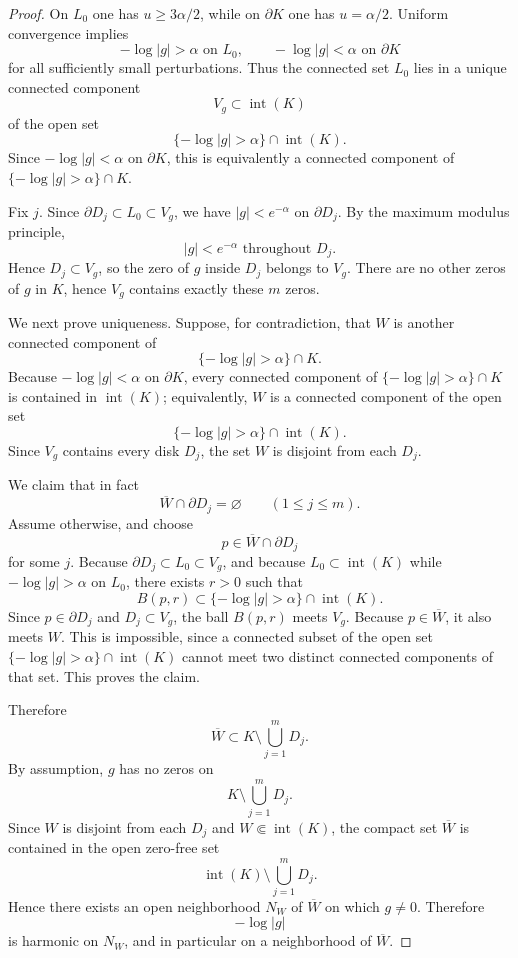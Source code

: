\documentclass[12pt]{amsart}
\theoremstyle{definition}
\theoremstyle{remark}
\begin{document}
\begin{proof} On $L_0$ one has $u\ge 3\alpha/2$, while on $\partial K$ one has $u=\alpha/2$. Uniform convergence implies
\[
 -\log|g|>\alpha \text{ on }L_0,\qquad -\log|g|<\alpha \text{ on }\partial K
\]
for all sufficiently small perturbations. Thus the connected set $L_0$ lies in a unique connected component
\[
 V_g\subset \operatorname{int}(K)
\]
of the open set
\[
\{-\log|g|>\alpha\}\cap \operatorname{int}(K).
\]
Since $-\log|g|<\alpha$ on $\partial K$, this is equivalently a connected component of
$\{-\log|g|>\alpha\}\cap K$.

\indent Fix $j$. Since $\partial D_j\subset L_0\subset V_g$, we have $|g|<e^{-\alpha}$ on $\partial D_j$. By the maximum modulus principle,
\[
 |g|<e^{-\alpha} \text{ throughout } D_j.
\]
Hence $D_j\subset V_g$, so the zero of $g$ inside $D_j$ belongs to $V_g$. There are no other zeros of $g$ in $K$, hence
$V_g$ contains exactly these $m$ zeros.

\indent We next prove uniqueness. Suppose, for contradiction, that $W$ is another connected
component of
\[
\{-\log|g|>\alpha\}\cap K.
\]
Because $-\log|g|<\alpha$ on $\partial K$, every connected component of
$\{-\log|g|>\alpha\}\cap K$ is contained in $\operatorname{int}(K)$; equivalently, $W$ is a
connected component of the open set
\[
\{-\log|g|>\alpha\}\cap \operatorname{int}(K).
\]
Since $V_g$ contains every disk $D_j$, the set $W$ is disjoint from each $D_j$.

We claim that in fact
\[
\overline{W}\cap \partial D_j=\varnothing
\qquad
(1\le j\le m).
\]
Assume otherwise, and choose
\[
p\in \overline{W}\cap \partial D_j
\]
for some $j$. Because $\partial D_j\subset L_0\subset V_g$, and because
$L_0\subset \operatorname{int}(K)$ while $-\log|g|>\alpha$ on $L_0$, there exists $r>0$
such that
\[
B(p,r)\subset \{-\log|g|>\alpha\}\cap \operatorname{int}(K).
\]
Since $p\in \partial D_j$ and $D_j\subset V_g$, the ball $B(p,r)$ meets $V_g$.
Because $p\in \overline{W}$, it also meets $W$. This is impossible, since a connected
subset of the open set $\{-\log|g|>\alpha\}\cap \operatorname{int}(K)$ cannot meet two distinct connected
components of that set. This proves the claim.

Therefore
\[
\overline{W}\subset K\setminus \bigcup_{j=1}^m D_j.
\]
By assumption, $g$ has no zeros on
\[
K \setminus \bigcup_{j=1}^m D_j.
\]
Since $W$ is disjoint from each $D_j$ and $W \Subset \operatorname{int}(K)$, the compact
set $\overline W$ is contained in the open zero-free set
\[
\operatorname{int}(K)\setminus \bigcup_{j=1}^m D_j.
\]
Hence there exists an open neighborhood $N_W$ of $\overline W$ on which $g\neq 0$.
Therefore
\[
-\log|g|
\]
is harmonic on $N_W$, and in particular on a neighborhood of $\overline W$.


\end{proof}
\end{document}
